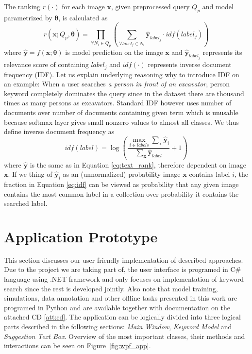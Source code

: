 The ranking $r(\cdot)$ for each image $\bm{x}$, given preprocessed query $Q_p$ and model parametrized by $\bm{\theta}$, is calculated as 
\begin{equation}
r\left(\bm{x}; Q_p, \bm{\theta}\right)=\prod\limits_{\forall N_i \in Q_p}\left(
	\sum\limits_{\forall label_j\in N_i} \bm{\hat{y}}_{label_j}\cdot idf\left(label_j\right)
\right)\label{eq:text_rank}
\end{equation}
where $\bm{\hat{y}}=f\left(\bm{x}; \bm{\theta}\right)$  is model prediction on the image $\bm{x}$ and $\bm{\hat{y}}_{label_j}$ represents its relevance score of containing $label_j$ and $idf(\cdot)$ represents inverse document frequency (IDF). Let us explain underlying reasoning why to introduce IDF on an example: When a user searches \textit{a person in front of an excavator}, person keyword completely dominates the query since in the dataset there are thousand times as many persons as excavators. Standard IDF however uses number of documents over number of documents containing given term which is unusable because softmax layer gives small nonzero values to almost all classes. We thus define inverse document frequency as
\begin{equation}
idf(label) = \log\left(
\frac{
\max\limits_{i\in labels} \sum_{\bm{x}}\hat{\bm{y}}_{i}
}{
\sum_{\bm{x}}\hat{\bm{y}}_{label}
} + 1\right)\label{eq:idf}
\end{equation}
where $\hat{\bm{y}}$ is the same as in Equation \ref{eq:text_rank}, therefore dependent on image $\bm{x}$. If we thing of $\hat{\bm{y}}_i$ as an (unnormalized) probability image $\bm{x}$ contains label $i$, the fraction in Equation \ref{eq:idf} can be viewed as probability that any given image contains the most common label in a collection over probability it contains the searched label.

\section{Application Prototype}\label{chap:application_prototype}
This section discusses our user-friendly implementation of described approaches. Due to the project we are taking part of, the user interface is programed in C\# language using .NET framework and only focuses on implementation of keyword search since the rest is developed jointly. Also note that model training, simulations, data annotation and other offline tasks presented in this work are programed in Python and are available together with documentation on the attached CD \ref{att:cd}. The application can be logically divided into three logical parts described in the following sections: \textit{Main Window}, \textit{Keyword Model} and \textit{Suggestion Text Box}. Overview of the most important classes, their methods and interactions can be seen on Figure~\ref{fig:wpf_app}.

